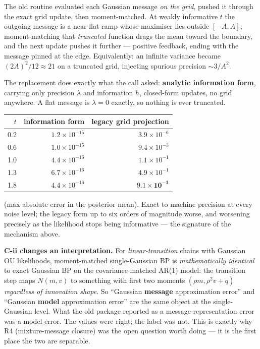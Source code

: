 \documentclass[11pt,a4paper]{article}
\begin{document}
The old routine evaluated each Gaussian message \emph{on the grid}, pushed it through the
exact grid update, then moment-matched. At weakly informative $t$ the outgoing message is a
near-flat ramp whose maximiser lies outside $[-A,A]$; moment-matching that \emph{truncated}
function drags the mean toward the boundary, and the next update pushes it further ---
positive feedback, ending with the message pinned at the edge. Equivalently: an infinite
variance became $(2A)^2/12 \approx 21$ on a truncated grid, injecting spurious precision
$\sim 3/A^2$.

The replacement does exactly what the call asked: \textbf{analytic information form},
carrying only precision $\lambda$ and information $h$, closed-form updates, no grid
anywhere. A flat message is $\lambda=0$ exactly, so nothing is ever truncated.

\begin{center}
\begin{tabular}{@{}rrr@{}}
\toprule
$t$ & information form & legacy grid projection \\
\midrule
0.2 & $1.2\times10^{-15}$ & $3.9\times10^{-6}$ \\
0.6 & $1.0\times10^{-15}$ & $9.4\times10^{-3}$ \\
1.0 & $4.4\times10^{-16}$ & $1.1\times10^{-1}$ \\
1.3 & $6.7\times10^{-16}$ & $4.9\times10^{-1}$ \\
1.8 & $4.4\times10^{-16}$ & $\mathbf{9.1\times10^{-1}}$ \\
\bottomrule
\end{tabular}
\end{center}

\noindent
(max absolute error in the posterior mean). Exact to machine precision at every noise level;
the legacy form up to six orders of magnitude worse, and worsening precisely as the
likelihood stops being informative --- the signature of the mechanism above.

\medskip
\textbf{C-ii changes an interpretation.} For \emph{linear-transition} chains with Gaussian
OU likelihoods, moment-matched single-Gaussian BP is \emph{mathematically identical} to
exact Gaussian BP on the covariance-matched AR(1) model: the transition step maps
$N(m,v)$ to something with first two moments $(\rho m, \rho^2 v + q)$ \emph{regardless of
innovation shape}. So ``Gaussian \textbf{message} approximation error'' and ``Gaussian
\textbf{model} approximation error'' are the same object at the single-Gaussian level. What
the old package reported as a message-representation error was a model error. The values
were right; the label was not. This is exactly why R4 (mixture-message closure) was the
open question worth doing --- it is the first place the two are separable.
\end{document}
